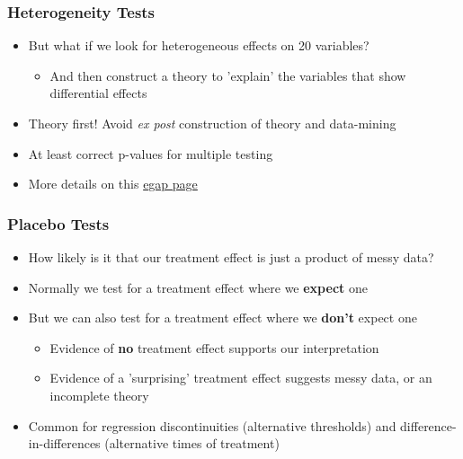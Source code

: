 \documentclass[xcolor=x11names,compress]{beamer}\usepackage[]{graphicx}\usepackage[]{color}
\renewcommand{\(}{\begin{columns}}
\renewcommand{\)}{\end{columns}}
\newcommand{\<}[1]{\begin{column}{#1}}
\renewcommand{\>}{\end{column}}
\begin{document}
\begin{frame}
\frametitle{Heterogeneity Tests}
\begin{itemize}
\item But what if we look for heterogeneous effects on 20 variables?
\pause
\begin{itemize}
\item And then construct a theory to 'explain' the variables that show differential effects
\end{itemize}
\pause
\item Theory first! Avoid \textit{ex post} construction of theory and data-mining
\pause
\item At least correct p-values for multiple testing 
\pause
\item More details on this \href{https://egap.org/methods-guides/10-things-heterogeneous-treatment-effects}{egap page}
\end{itemize}
\end{frame}

\begin{frame}
\frametitle{Placebo Tests}
\begin{itemize}
\item How likely is it that our treatment effect is just a product of messy data?
\pause
\item Normally we test for a treatment effect where we \textbf{expect} one
\pause
\item But we can also test for a treatment effect where we \textbf{don't} expect one
\begin{itemize}
\item Evidence of \textbf{no} treatment effect supports our interpretation
\pause
\item Evidence of a 'surprising' treatment effect suggests messy data, or an incomplete theory
\end{itemize}
\pause
\item Common for regression discontinuities (alternative thresholds) and difference-in-differences (alternative times of treatment)
\end{itemize}
\end{frame}
\end{document}
